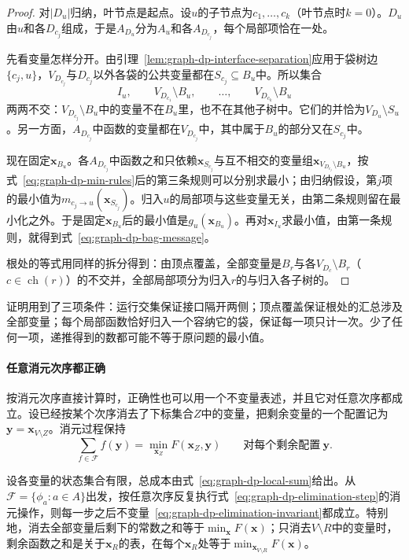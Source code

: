 \begin{proof}
对$|D_u|$归纳，叶节点是起点。设$u$的子节点为$c_1,\ldots,c_k$（叶节点时$k=0$）。$D_u$由$u$和各$D_{c_j}$组成，于是$A_{D_u}$分为$A_u$和各$A_{D_{c_j}}$，每个局部项恰在一处。

先看变量怎样分开。由引理~\ref{lem:graph-dp-interface-separation}应用于袋树边$\{c_j,u\}$，$V_{D_{c_j}}$与$D_{c_j}$以外各袋的公共变量都在$S_{c_j}\subseteq B_u$中。所以集合
\[
I_u,\qquad V_{D_{c_1}}\setminus B_u,\qquad\ldots,\qquad V_{D_{c_k}}\setminus B_u
\]
两两不交：$V_{D_{c_j}}\setminus B_u$中的变量不在$B_u$里，也不在其他子树中。它们的并恰为$V_{D_u}\setminus S_u$。另一方面，$A_{D_{c_j}}$中函数的变量都在$V_{D_{c_j}}$中，其中属于$B_u$的部分又在$S_{c_j}$中。

现在固定$\bm x_{B_u}$。各$A_{D_{c_j}}$中函数之和只依赖$\bm x_{S_{c_j}}$与互不相交的变量组$\bm x_{V_{D_{c_j}}\setminus B_u}$，按式~\eqref{eq:graph-dp-min-rules}后的第三条规则可以分别求最小；由归纳假设，第$j$项的最小值为$m_{c_j\to u}(\bm x_{S_{c_j}})$。归入$u$的局部项与这些变量无关，由第二条规则留在最小化之外。于是固定$\bm x_{B_u}$后的最小值是$g_u(\bm x_{B_u})$。再对$\bm x_{I_u}$求最小值，由第一条规则，就得到式~\eqref{eq:graph-dp-bag-message}。

根处的等式用同样的拆分得到：由顶点覆盖，全部变量是$B_r$与各$V_{D_c}\setminus B_r$（$c\in\operatorname{ch}(r)$）的不交并，全部局部项分为归入$r$的与归入各子树的。
\end{proof}

证明用到了三项条件：运行交集保证接口隔开两侧；顶点覆盖保证根处的汇总涉及全部变量；每个局部函数恰好归入一个容纳它的袋，保证每一项只计一次。少了任何一项，递推得到的数都可能不等于原问题的最小值。

\paragraph{任意消元次序都正确}
按消元次序直接计算时，正确性也可以用一个不变量表述，并且它对任意次序都成立。设已经按某个次序消去了下标集合$Z$中的变量，把剩余变量的一个配置记为$\bm y=\bm x_{V\setminus Z}$。消元过程保持
\begin{equation}
\sum_{f\in\mathcal F}f(\bm y)=\min_{\bm x_Z}F(\bm x_Z,\bm y)\qquad\text{对每个剩余配置}\ \bm y .
\label{eq:graph-dp-elimination-invariant}
\end{equation}

\begin{theorem}[变量消元的正确性]
\label{thm:graph-dp-elimination}
设各变量的状态集合有限，总成本由式~\eqref{eq:graph-dp-local-sum}给出。从$\mathcal F=\{\phi_a:a\in A\}$出发，按任意次序反复执行式~\eqref{eq:graph-dp-elimination-step}的消元操作，则每一步之后不变量~\eqref{eq:graph-dp-elimination-invariant}都成立。特别地，消去全部变量后剩下的常数之和等于$\min_{\bm x}F(\bm x)$；只消去$V\setminus R$中的变量时，剩余函数之和是关于$\bm x_R$的表，在每个$\bm x_R$处等于$\min_{\bm x_{V\setminus R}}F(\bm x)$。
\end{theorem}

